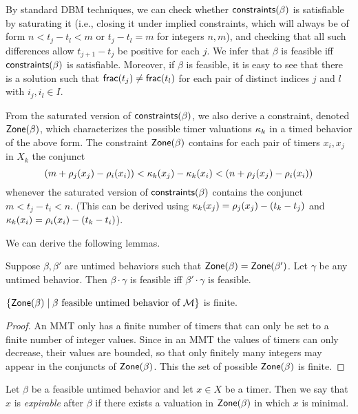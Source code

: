 By standard DBM techniques, we can check whether $\mathsf{constraints}({\beta})$ is satisfiable by saturating it (i.e., closing it under implied constraints, which
will always be of form
$n < t_j - t_l < m$ or $t_j - t_l = m$ for integers $n,m$), and checking that
all such differences allow $t_{j+1} - t_j$ be positive for each $j$.
We infer that $\beta$ is feasible iff $\mathsf{constraints}({\beta})$ is satisfiable.
Moreover, if $\beta$ is feasible, it is easy to see that there is a solution
such that $\mathsf{frac}({t_j}) \neq \mathsf{frac}({t_l})$ for each pair of distinct indices $j$ and $l$ with $i_j, i_l \in I$.

From the saturated version of $\mathsf{constraints}({\beta})$, we also derive a constraint,
denoted $\mathsf{Zone}({\beta})$,
which characterizes the possible timer valuations $\kappa_k$ in a timed
behavior of the above form.  The constraint $\mathsf{Zone}({\beta})$
contains for each pair of timers $x_i,x_j$ in $X_k$ the conjunct
\[
(m + \rho_j(x_j) - \rho_i(x_i)) < \kappa_k(x_j) -\kappa_k(x_i) < (n + \rho_j(x_j) - \rho_i(x_i))
\]
whenever the saturated version of $\mathsf{constraints}({\beta})$ contains the conjunct
\(
m < t_j - t_i < n
\).
(This can be derived using
$\kappa_k(x_j) = \rho_j(x_j) - (t_k - t_j)$
and
$\kappa_k(x_i) = \rho_i(x_i) - (t_k - t_i)$).

We can derive the following lemmas.

\begin{lemma}
\label{lemma: feasibility concatenation}
Suppose $\beta, \beta'$ are untimed behaviors such that
$\mathsf{Zone}({\beta}) = \mathsf{Zone}({\beta'})$. Let $\gamma$ be any untimed behavior.
Then $\beta \cdot \gamma$ is feasible iff $\beta' \cdot \gamma$ is feasible.
\end{lemma}

\begin{lemma}
\label{lemma finitely many zones}
$\{ \mathsf{Zone}({\beta}) \mid \beta \mbox{ feasible untimed behavior of } {\mathcal M} \}$ is finite.
\end{lemma}
\begin{proof}
  An MMT only has a finite number of timers that can only be set to a finite number of integer values. Since in an MMT the values of timers can only decrease, their values are bounded, so that only finitely many integers may appear in the conjuncts of $\mathsf{Zone}({\beta})$. This the set of possible $\mathsf{Zone}({\beta})$ is finite.
\end{proof}

Let $\beta$ be a feasible untimed behavior and let $x \in X$ be a timer. Then we say that $x$ is \emph{expirable} after $\beta$
if there exists a valuation in $\mathsf{Zone}({\beta})$ in which $x$ is minimal.

